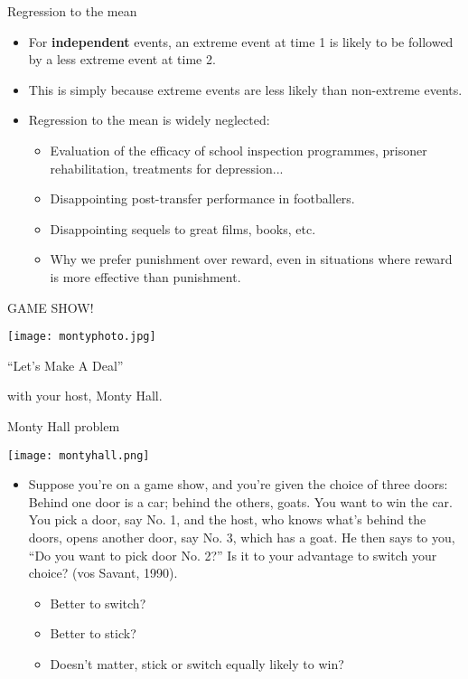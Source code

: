 \documentclass{beamer}
\begin{document}
\begin{frame}{Regression to the mean}
\begin{itemize}
\item For \textbf{independent} events, an extreme event at time 1 is likely to be followed by a less extreme event at time 2.
\item This is simply because extreme events are less likely than non-extreme events.
\item Regression to the mean is widely neglected:
\begin{itemize}
\item Evaluation of the efficacy of school inspection programmes, prisoner rehabilitation, treatments for depression...
\item Disappointing post-transfer performance in footballers.
\item Disappointing sequels to great films, books, etc.
\item Why we prefer punishment over reward, even in situations where reward is more effective than punishment.
\end{itemize}
\end{itemize}
\end{frame}

\begin{frame}{GAME SHOW!}
\centerline{\texttt{[image: montyphoto.jpg]}}
\centerline{``Let's Make A Deal''}
\centerline{with your host, Monty Hall.}
\end{frame}

\begin{frame}{Monty Hall problem}
\centerline{\texttt{[image: montyhall.png]}}
\begin{itemize}

\item Suppose you're on a game show, and you're given the choice of three doors: Behind one door is a car; behind the others, goats. You want to win the car. You pick a door, say No. 1, and the host, who knows what's behind the doors, opens another door, say No. 3, which has a goat. He then says to you, ``Do you want to pick door No. 2?'' Is it to your advantage to switch your choice? (vos Savant, 1990).
\begin{itemize}
\item Better to switch?
\item Better to stick?
\item Doesn't matter, stick or switch equally likely to win?
\end{itemize}
\end{itemize}
\end{frame}
\end{document}
